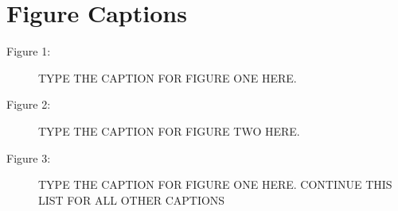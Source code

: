 \documentclass[preprint,5p]{elsarticle}
\begin{document}





\pagebreak

%
%

\begin{thebibliography}{00}
\end{thebibliography}



\pagebreak

\section*{Figure Captions}

\begin{description}
\item[Figure 1:]  TYPE THE CAPTION FOR FIGURE ONE HERE.
\item[Figure 2:]  TYPE THE CAPTION FOR FIGURE TWO HERE.
\item[Figure 3:]  TYPE THE CAPTION FOR FIGURE ONE HERE.  CONTINUE THIS LIST FOR ALL OTHER CAPTIONS
\end{description}
\end{document}
